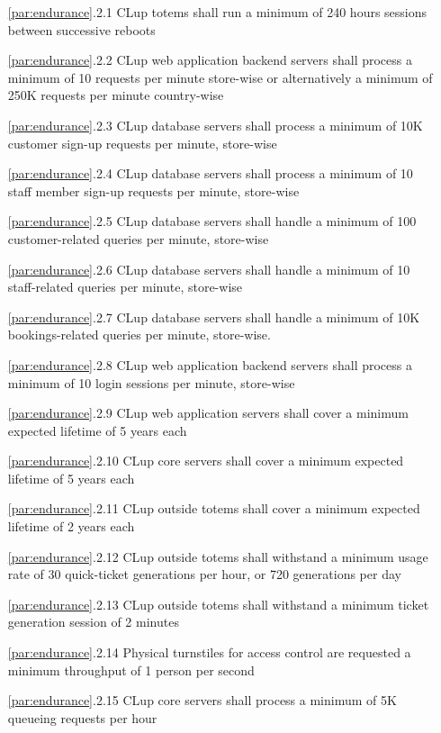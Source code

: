 \begin{itemize}[leftmargin=+.8in]
    \item [\ref{par:endurance}.2.1] CLup totems shall run a minimum of 240 hours sessions between successive reboots
    \item [\ref{par:endurance}.2.2] CLup web application backend servers shall process a minimum of 10 requests per minute store-wise or alternatively a minimum of 250K requests per minute country-wise
    \item [\ref{par:endurance}.2.3] CLup database servers shall process a minimum of 10K customer sign-up requests per minute, store-wise 
    \item [\ref{par:endurance}.2.4] CLup database servers shall process a minimum of 10 staff member sign-up requests per minute, store-wise
    \item [\ref{par:endurance}.2.5] CLup database servers shall handle a minimum of 100 customer-related queries per minute, store-wise
    \item [\ref{par:endurance}.2.6] CLup database servers shall handle a minimum of 10 staff-related queries per minute, store-wise
    \item [\ref{par:endurance}.2.7] CLup database servers shall handle a minimum of 10K bookings-related queries per minute, store-wise.
    \item [\ref{par:endurance}.2.8] CLup web application backend servers shall process a minimum of 10 login sessions per minute, store-wise 
    \item [\ref{par:endurance}.2.9] CLup web application servers shall cover a minimum expected lifetime of 5 years each
    \item [\ref{par:endurance}.2.10] CLup core servers shall cover a minimum expected lifetime of 5 years each
    \item [\ref{par:endurance}.2.11] CLup outside totems shall cover a minimum expected lifetime of 2 years each
    \item [\ref{par:endurance}.2.12] CLup outside totems shall withstand a minimum usage rate of 30 quick-ticket generations per hour, or 720 generations per day
    \item [\ref{par:endurance}.2.13] CLup outside totems shall withstand a minimum ticket generation session of 2 minutes
    \item [\ref{par:endurance}.2.14] Physical turnstiles for access control are requested a minimum throughput of 1 person per second
    \item [\ref{par:endurance}.2.15] CLup core servers shall process a minimum of 5K queueing requests per hour
    
\end{itemize}

